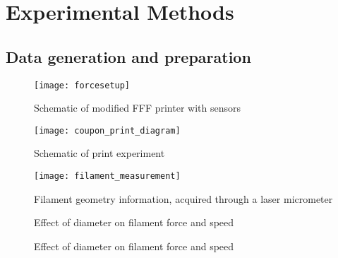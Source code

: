 \documentclass[main.tex]{subfiles}
\begin{document}
\section{Experimental Methods} \label{sec:ml_meth}

\subsection{Data generation and preparation}\label{ssec:datag}

\begin{figure}[!htbp]
	\center
	\texttt{[image: forcesetup]}
	\caption{Schematic of modified FFF printer with sensors} \label{fig:shakira}
\end{figure}

\begin{figure}[!htbp]
	\center
	\texttt{[image: coupon\_print\_diagram]}
	\caption{Schematic of print experiment} \label{fig:print_dia}
\end{figure}

\begin{figure}[!htbp]
	\center
	\texttt{[image: filament\_measurement]}
	\caption{Filament geometry information, acquired through a laser micrometer } \label{fig:FD}
\end{figure}

\begin{figure}[h]
	\center
	\linebreak
	\caption{Effect of diameter on filament force and speed} \label{fig:dia_f_sp}
\end{figure}

\begin{figure}[h]
	\center
	\linebreak
	\caption{Effect of diameter on filament force and speed} \label{fig:ov_f_sp}
\end{figure}
\end{document}
